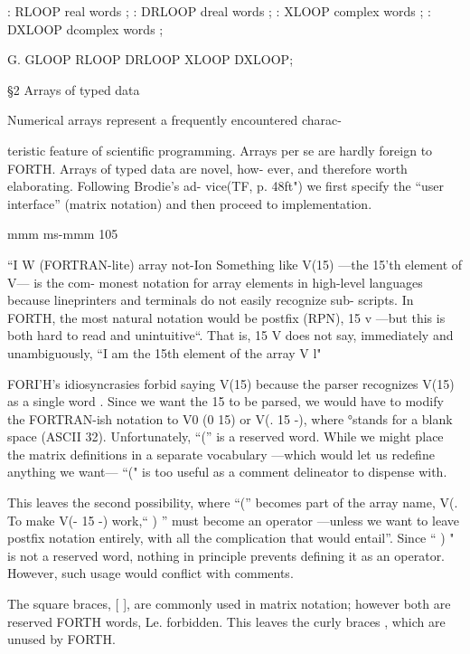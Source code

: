     : RLOOP real words ;
    : DRLOOP dreal words ;
    : XLOOP complex words ;
    : DXLOOP dcomplex words ;

    G. GLOOP RLOOP DRLOOP XLOOP DXLOOP;

§2 Arrays of typed data

Numerical arrays represent a frequently encountered charac-

teristic feature of scientific programming. Arrays per se are
hardly foreign to FORTH. Arrays of typed data are novel, how-
ever, and therefore worth elaborating. Following Brodie’s ad-
vice(TF, p. 48ft") we first specify the “user interface” (matrix
notation) and then proceed to implementation.

mmm ms-mmm 105

“I W (FORTRAN-lite) array not-Ion
Something like V(15) —the 15'th element of V— is the com-
monest notation for array elements in high-level languages
because lineprinters and terminals do not easily recognize sub-
scripts. In FORTH, the most natural notation would be postfix
(RPN), 15 v —but this is both hard to read and unintuitive“.
That is, 15 V does not say, immediately and unambiguously,
“I am the 15th element of the array V l"

FORI'H's idiosyncrasies forbid saying V(15) because the parser
recognizes V(15) as a single word . Since we want the 15 to be
parsed, we would have to modify the FORTRAN-ish notation to
V0 (0 15) or V(. 15 -), where °stands for a blank space (ASCII 32).
Unfortunately, “(” is a reserved word. While we might place the
matrix definitions in a separate vocabulary —which would let us
redefine anything we want— “(" is too useful as a comment
delineator to dispense with.

This leaves the second possibility, where “(” becomes part of
the array name, V(. To make V(- 15 -) work,“ ) ” must become
an operator —unless we want to leave postfix notation entirely,
with all the complication that would entail”. Since “ ) " is not a
reserved word, nothing in principle prevents defining it as an
operator. However, such usage would conflict with comments.

The square braces, [ ], are commonly used in matrix notation;
however both are reserved FORTH words, Le. forbidden. This
leaves the curly braces { }, which are unused by FORTH.


